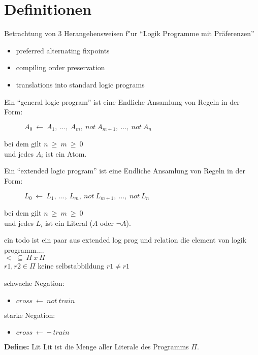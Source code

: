 \section{Definitionen}

Betrachtung von 3 Herangehensweisen f"ur ``Logik Programme mit Präferenzen''
\begin{itemize}
  \item preferred alternating fixpoints
  \item compiling order preservation
  \item translations into standard logic programs
\end{itemize}


Ein ``general logic program'' ist eine Endliche Ansamlung von Regeln in der Form:
\begin{figure}
  \begin{math}
    A_0~\leftarrow~A_1,~...,~A_m,~not~A_{m+1},~...,~not~A_n
  \end{math}
\end{figure}
bei dem gilt $n~\geq~m~\geq~0$\\[0.5cm]
und jedes $A_i$ ist ein Atom.


Ein ``extended logic program'' ist eine Endliche Ansamlung von Regeln in der Form:
\begin{figure}
  \begin{math}
    L_0~\leftarrow~L_1,~...,~L_m,~not~L_{m+1},~...,~not~L_n
  \end{math}
\end{figure}
bei dem gilt $n~\geq~m~\geq~0$\\[0.5cm]
und jedes $L_i$ ist ein Literal ($A$ oder $\neg A$).


ein todo ist ein paar aus extended log prog und relation die element von logik programm....\\
$<~\subseteq~\Pi~x~\Pi$\\
$r1, r2 \in \Pi$
keine selbstabbildung $r1 \neq r1$


schwache Negation:
\begin{itemize}
  \item $cross~\leftarrow~not~train$
\end{itemize}
starke Negation:
\begin{itemize}
  \item $cross~\leftarrow~\neg~train$
\end{itemize}


{\textbf{Define:} Lit}
  Lit ist die Menge aller Literale des Programms $\Pi$.

